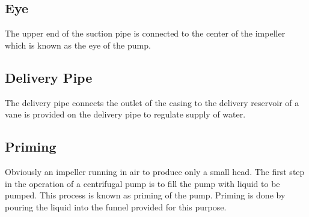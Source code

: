 \documentclass{article}
\begin{document}
\begin{multicols}{2}
  \subsection*{Eye}
  The upper end of the suction pipe is connected to the center of the impeller which is known as the eye of the pump. 

  \subsection*{Delivery Pipe}
  The delivery pipe connects the outlet of the casing to the delivery reservoir of a vane is provided on the delivery pipe to regulate supply of water.

  \subsection*{Priming}
  Obviously an impeller running in air to produce only a small head. The first step in the operation of a centrifugal pump is to fill the pump with liquid to be pumped. This process is known as priming of the pump. Priming is done by pouring the liquid into the funnel provided for this purpose. 
\end{multicols}
\end{document}
